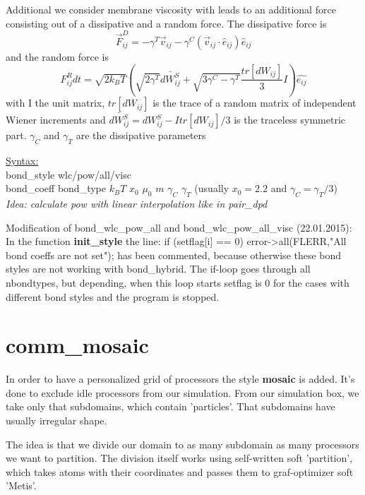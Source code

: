 Additional we consider membrane viscosity with leads to an additional force consisting out of a dissipative and a random force. The dissipative force is
% 
\begin{equation}
	\vec{F}^D_{ij} = -\gamma^T\vec{v}_{ij} -\gamma^C(\vec{v}_{ij}\cdot \hat{e}_{ij})\hat{e}_{ij}
\end{equation}
%
and the random force is
%
\begin{equation}
	F^R_{ij}dt = \sqrt{2k_BT}\left(\sqrt{2\gamma^T} \bar{dW_{ij}^S} + \sqrt{3\gamma^C-\gamma^T} \frac{tr[dW_{ij}]}{3}I\right)\hat{e_{ij}}
\end{equation}
%
with I the unit matrix, $tr[dW_{ij}]$ is the trace of a random matrix of independent Wiener increments and $\bar{dW_{ij}^S} = dW_{ij}^S - I tr[dW_{ij}]/3$ is the traceless symmetric part. $\gamma_C$ and $\gamma_T$ are the dissipative parameters

\underline{Syntax:}\\
bond\_style \quad wlc/pow/all/visc\\
bond\_coeff \quad bond\_type $k_BT$ $x_0$ $\mu_0$ $m$ $\gamma_C$ $\gamma_T$ (usually $x_0=2.2$ and $\gamma_C = \gamma_T/3$)\\
\textit{Idea: calculate pow with linear interpolation like in pair\_dpd}

\hspace{2em}

Modification of bond\_wlc\_pow\_all and bond\_wlc\_pow\_all\_visc (22.01.2015):
In the function \textbf{init\_style} the line: if (setflag[i] == 0) error->all(FLERR,"All bond coeffs are not set"); has been commented, because otherwise these bond styles are not working with bond\_hybrid. 
The if-loop goes through all nbondtypes, but depending, when this loop starts setflag is 0 for the cases with different bond styles and the program is stopped.


\section{comm\_mosaic}
In order to have a personalized grid of processors the style \textbf{mosaic} is added. It's done to exclude idle processors from our simulation. From our simulation box, we take only that subdomains, which contain 'particles'. That subdomains have usually irregular shape.

The idea is that we divide our domain to as many subdomain as many processors we want to partition. The division itself works using self-written soft 'partition', which takes atoms with their coordinates and passes them to graf-optimizer soft 'Metis'.

